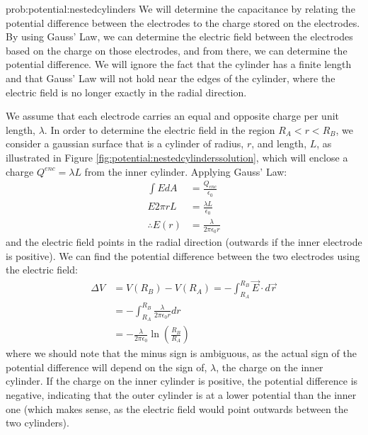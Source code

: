 \begin{solution}{prob:potential:nestedcylinders}\label{soln:potential:nestedcylinders} We will determine the capacitance by relating the potential difference between the electrodes to the charge stored on the electrodes. By using Gauss' Law, we can determine the electric field between the electrodes based on the charge on those electrodes, and from there, we can determine the potential difference. We will ignore the fact that the cylinder has a finite length and that Gauss' Law will not hold near the edges of the cylinder, where the electric field is no longer exactly in the radial direction.

We assume that each electrode carries an equal and opposite charge per unit length, $\lambda$. In order to determine the electric field in the region $R_A<r<R_B$, we consider a gaussian surface that is a cylinder of radius, $r$, and length, $L$, as illustrated in Figure \ref{fig:potential:nestedcylinderssolution}, which will enclose a charge $Q^{enc}=\lambda L$ from the inner cylinder. 
Applying Gauss' Law:
\begin{align*}
\int E dA &= \frac{Q_{enc}}{\epsilon_0}\\
E 2\pi rL &= \frac{\lambda L}{\epsilon_0}\\
\therefore E(r) &= \frac{\lambda }{2\pi \epsilon_0 r}
\end{align*}
and the electric field points in the radial direction (outwards if the inner electrode is positive). We can find the potential difference between the two electrodes using the electric field:
\begin{align*}
\Delta V &= V(R_B)-V(R_A)= -\int_{R_A}^{R_B} \vec E \cdot d\vec r\\
&=-\int_{R_A}^{R_B} \frac{\lambda }{2\pi \epsilon_0 r} dr\\
&= -\frac{\lambda }{2\pi \epsilon_0}\ln\left( \frac{R_B}{R_A} \right) 
\end{align*}
where we should note that the minus sign is ambiguous, as the actual sign of the potential difference will depend on the sign of, $\lambda$, the charge on the inner cylinder. If the charge on the inner cylinder is positive, the potential difference is negative, indicating that the outer cylinder is at a lower potential than the inner one (which makes sense, as the electric field would point outwards between the two cylinders). 


\end{solution}
